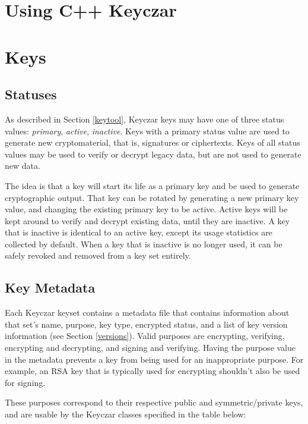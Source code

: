 \documentclass{llncs}
\begin{document}
\section{Using C++ Keyczar}

\section{Keys}

\subsection{Statuses}\label{status}

As described in Section \ref{keytool}, Keyczar keys may have one of three
status values: {\it primary}, {\it active}, {\it inactive}.
Keys with a primary status value are used to generate new cryptomaterial, that
is, signatures or ciphertexts. Keys of all status values may be used to verify
or decrypt legacy data, but are not used to generate new data.

The idea is that a key will start its life as a primary key and be used to
generate cryptographic output. That key can be rotated by generating a new
primary key value, and changing the existing primary key to be active. Active
keys will be kept around to verify and decrypt existing data, until they are
inactive. A key that is inactive is identical
to an active key, except its usage statistics are collected by default. When a
key that is inactive is no longer used, it can be safely
revoked and removed from a key set entirely.

\subsection{Key Metadata}\label{metadata}

Each Keyczar keyset contains a metadata file that contains information about
that set's name, purpose, key type, encrypted status, and a list of key version
information (see Section \ref{versions}). Valid purposes are encrypting, 
verifying, encrypting and decrypting, and signing and verifying. Having the
purpose value in the metadata prevents a key from being used for an 
inappropriate purpose. For example, an RSA key that is typically used for
encrypting shouldn't also be used for signing.

These purposes correspond to their respective public and symmetric/private
keys, and are usable by the Keyczar classes specified in the table below: 
\end{document}
